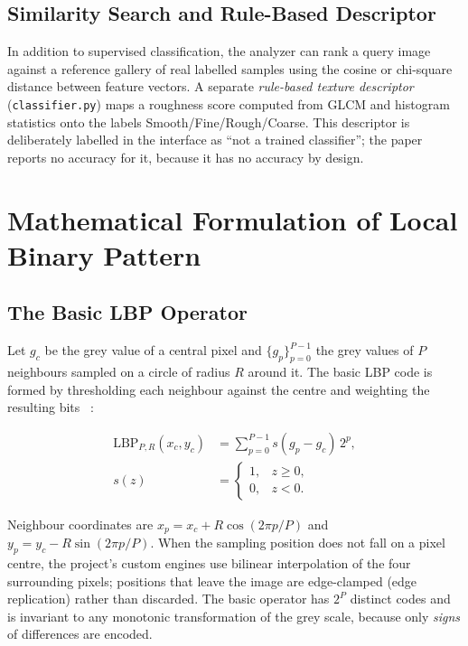 \documentclass[conference]{IEEEtran}
\begin{document}
\subsection{Similarity Search and Rule-Based Descriptor}
In addition to supervised classification, the analyzer can rank a query
image against a reference gallery of real labelled samples using the cosine
or chi-square distance between feature vectors. A separate
\emph{rule-based texture descriptor} (\texttt{classifier.py}) maps a
roughness score computed from GLCM and histogram statistics onto the labels
Smooth/Fine/Rough/Coarse. This descriptor is deliberately labelled in the
interface as ``not a trained classifier''; the paper reports no accuracy
for it, because it has no accuracy by design.

\section{Mathematical Formulation of Local Binary Pattern}\label{sec:math}
\subsection{The Basic LBP Operator}
Let $g_c$ be the grey value of a central pixel and $\{g_p\}_{p=0}^{P-1}$
the grey values of $P$ neighbours sampled on a circle of radius $R$
around it. The basic LBP code is formed by thresholding each neighbour
against the centre and weighting the resulting bits ~\cite{ojala1996comparative,ojala2002multiresolution}:

\begin{equation}
\begin{aligned}
\mathrm{LBP}_{P,R}(x_c,y_c)
&=\sum_{p=0}^{P-1} s\!\left(g_p-g_c\right)\,2^{p},\\
s(z)&=
\begin{cases}1,& z\ge 0,\\ 0,& z<0.\end{cases}
\end{aligned}
\label{eq:lbp}
\end{equation}

Neighbour coordinates are $x_p = x_c + R\cos(2\pi p/P)$ and
$y_p = y_c - R\sin(2\pi p/P)$. When the sampling position does not fall on a
pixel centre, the project's custom engines use bilinear interpolation of
the four surrounding pixels; positions that leave the image are edge-clamped
(edge replication) rather than discarded. The basic operator has $2^P$
distinct codes and is invariant to any monotonic transformation of the grey
scale, because only \emph{signs} of differences are encoded.
\end{document}
